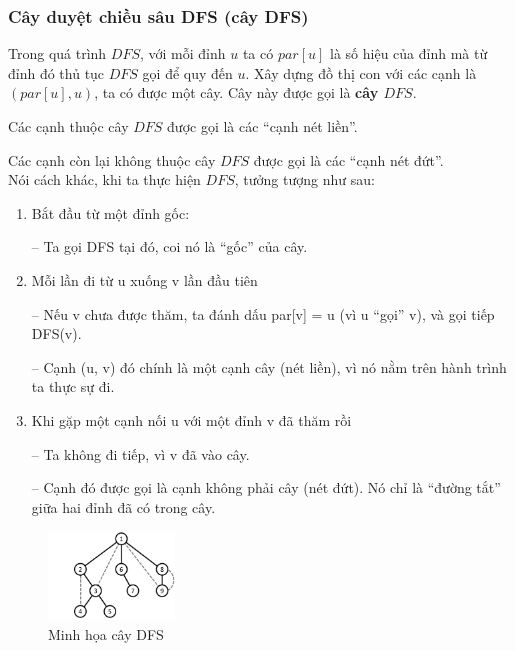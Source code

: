 \documentclass{article}
\begin{document}
\subsubsection{Cây duyệt chiều sâu DFS (cây DFS)}

Trong quá trình $DFS$, với mỗi đỉnh $u$ ta có $par[u]$ là số hiệu của đỉnh mà từ đỉnh đó thủ tục $DFS$ gọi để quy đến $u$. Xây dựng đồ thị con với các cạnh là $(par[u], u)$, ta có được một cây. Cây này được gọi là \textbf{cây $DFS$}.   

Các cạnh thuộc cây $DFS$ được gọi là các ``cạnh nét liền''.

Các cạnh còn lại không thuộc cây $DFS$ được gọi là các ``cạnh nét đứt''.\\

Nói cách khác, khi ta thực hiện $DFS$, tưởng tượng như sau:

\begin{enumerate}
    \item Bắt đầu từ một đỉnh gốc:

    – Ta gọi DFS tại đó, coi nó là “gốc” của cây.
    \item Mỗi lần đi từ u xuống v lần đầu tiên
    
    – Nếu v chưa được thăm, ta đánh dấu par[v] = u (vì u ``gọi'' v), và gọi tiếp DFS(v).
    
    – Cạnh (u, v) đó chính là một cạnh cây (nét liền), vì nó nằm trên hành trình ta thực sự đi.
    \item Khi gặp một cạnh nối u với một đỉnh v đã thăm rồi
    
    – Ta không đi tiếp, vì v đã vào cây.

    – Cạnh đó được gọi là cạnh không phải cây (nét đứt). Nó chỉ là ``đường tắt'' giữa hai đỉnh đã có trong cây.
\end{enumerate}


\begin{figure}[h]
    \centering
    \includegraphics[width=0.3\textwidth]{img/b3/Depth-First-Search-Tree_img1.png}
    \caption{Minh họa cây DFS}    
\end{figure}
\end{document}
